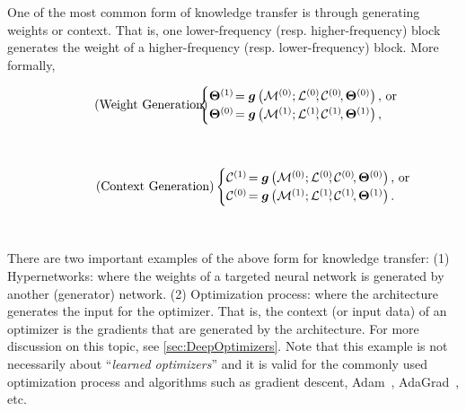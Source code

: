 \documentclass{article}
\newcommand{\citep}{\parencite}
\newcommand{\M}[0]{\mathcal{M}}
\newcommand{\head}[1]{\vspace{1.7mm}\noindent{{\textcolor{c4}{\bf #1.}}}}
\begin{document}
\head{Connections with Generation}
One of the most common form of knowledge transfer is through generating weights or context. That is, one lower-frequency (resp. higher-frequency) block generates the weight of a higher-frequency (resp. lower-frequency) block. More formally, 

\vspace{-9pt}
\begin{minipage}[t]{0.49\textwidth}
\begin{align}\tag{Weight Generation}
    \hspace*{-2ex}\begin{cases}
        \boldsymbol{\Theta}^{(1)} \!= \boldsymbol{g}\left( \M^{(0)}; \mathcal{L}^{(0)}\!\!, \mathcal{C}^{(0)}\!, \boldsymbol{\Theta}^{(0)} \right), & \!\!\!\!\text{or \:} \hspace*{-1.5ex}  \\ 
    \boldsymbol{\Theta}^{(0)} \!= \boldsymbol{g}\left( \M^{(1)}; \mathcal{L}^{(1)}\!\!, \mathcal{C}^{(1)}\!, \boldsymbol{\Theta}^{(1)} \right),
    \end{cases}
\end{align}
\end{minipage}
\hspace{0.0ex}~
\textcolor{mydarkpurple}{\vline}~
\hspace{-5.5ex}~
\begin{minipage}[t]{0.53\textwidth}
    \begin{align}\tag{Context Generation}
    \begin{cases}
        \mathcal{C}^{(1)} \!= \boldsymbol{g}\left( \M^{(0)}; \mathcal{L}^{(0)}\!\!, \mathcal{C}^{(0)}\!, \boldsymbol{\Theta}^{(0)} \right), & \!\!\!\! \text{or} \hspace*{-3ex} \\ 
    \mathcal{C}^{(0)} \!= \boldsymbol{g}\left( \M^{(1)}; \mathcal{L}^{(1)}\!\!, \mathcal{C}^{(1)}\!, \boldsymbol{\Theta}^{(1)} \right).
    \end{cases}
\end{align}
\end{minipage}
~

There are two important examples of the above form for knowledge transfer: (1) Hypernetworks: where the weights of a targeted neural network is generated by another (generator) network. (2) Optimization process: where the architecture generates the input for the optimizer. That is, the context (or input data) of an optimizer is the gradients that are generated by the architecture. For more discussion on this topic, see \autoref{sec:DeepOptimizers}. Note that this example is not necessarily about ``\emph{learned optimizers}'' and it is valid for the commonly used optimization process and algorithms such as gradient descent, Adam~\citep{kingma2014adam}, AdaGrad~\citep{duchi2011adaptive}, etc.   
\end{document}
